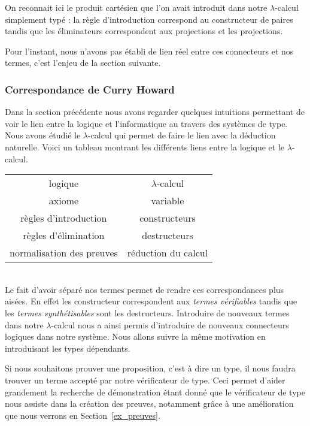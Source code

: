 \documentclass {article}
\theoremstyle{definition}
\theoremstyle{remark}
\begin{document}
On reconnait ici le produit cartésien que l'on avait introduit dans
notre $\lambda$-calcul simplement typé : la règle d'introduction
correspond au constructeur de paires tandis que les éliminateurs
correspondent aux projections \Fst{} et \Snd{} les
projections.


Pour l'instant, nous n'avons pas établi de lien réel entre ces connecteurs et nos termes, c'est l'enjeu de la
section suivante.

\subsubsection{Correspondance de Curry Howard}
\label{corres_curry_howard}

Dans la section précédente nous avons regarder quelques intuitions permettant de voir le lien entre la logique
et l'informatique au travers des systèmes de type.
Nous avons étudié le $\lambda$-calcul qui permet de faire le lien avec la déduction naturelle. 
Voici un tableau montrant les différents liens entre la logique et le $\lambda$-calcul.

\begin{tabular}{c@{\quad$\leftrightarrow$\quad}c}
  logique & $\lambda$-calcul \\
  axiome & variable \\
  règles d'introduction & constructeurs \\
  règles d'élimination & destructeurs \\
  normalisation des preuves & réduction du calcul \\
\end{tabular}
\\


Le fait d'avoir séparé nos termes permet de rendre ces correspondances plus aisées. En effet les constructeur
correspondent aux \emph{termes vérifiables} tandis que les \emph{termes synthétisables} sont les destructeurs.
Introduire de nouveaux termes dans notre $\lambda$-calcul nous a ainsi permis d'introduire de nouveaux connecteurs logiques dans notre système. Nous allons suivre la même motivation en introduisant les types dépendants.

Si nous souhaitons prouver une proposition, c'est à dire un type, il nous faudra trouver
un terme accepté par notre vérificateur de type.
Ceci permet d'aider grandement la recherche de démonstration étant donné que le vérificateur de type nous assiste dans la création des preuves, notamment grâce à une amélioration
que nous verrons en Section~\ref{ex_preuves}.
\end{document}
